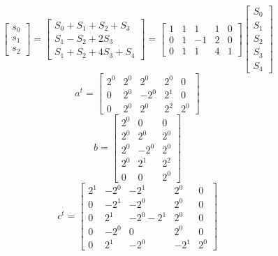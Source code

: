 \documentclass{article}%
\begin{document}
\[%
\left[\begin{matrix}s_{0}\\s_{1}\\s_{2}\end{matrix}\right] = \left[\begin{matrix}S_{0} + S_{1} + S_{2} + S_{3}\\S_{1} - S_{2} + 2 S_{3}\\S_{1} + S_{2} + 4 S_{3} + S_{4}\end{matrix}\right] = \left[\begin{matrix}1 & 1 & 1 & 1 & 0\\0 & 1 & -1 & 2 & 0\\0 & 1 & 1 & 4 & 1\end{matrix}\right] \left[\begin{matrix}S_{0}\\S_{1}\\S_{2}\\S_{3}\\S_{4}\end{matrix}\right]%
\]%
\[%
a^{t} = \left[\begin{matrix}2^{0} & 2^{0} & 2^{0} & 2^{0} & 0\\0 & 2^{0} & - 2^{0} & 2^{1} & 0\\0 & 2^{0} & 2^{0} & 2^{2} & 2^{0}\end{matrix}\right]%
\]%
\[%
b = \left[\begin{matrix}2^{0} & 0 & 0\\2^{0} & 2^{0} & 2^{0}\\2^{0} & - 2^{0} & 2^{0}\\2^{0} & 2^{1} & 2^{2}\\0 & 0 & 2^{0}\end{matrix}\right]%
\]%
\[%
c^{t} = \left[\begin{matrix}2^{1} & - 2^{0} & - 2^{1} & 2^{0} & 0\\0 & - 2^{1} & - 2^{0} & 2^{0} & 0\\0 & 2^{1} & - 2^{0} - 2^{1} & 2^{0} & 0\\0 & - 2^{0} & 0 & 2^{0} & 0\\0 & 2^{1} & - 2^{0} & - 2^{1} & 2^{0}\end{matrix}\right]%
\]%
\end{document}
